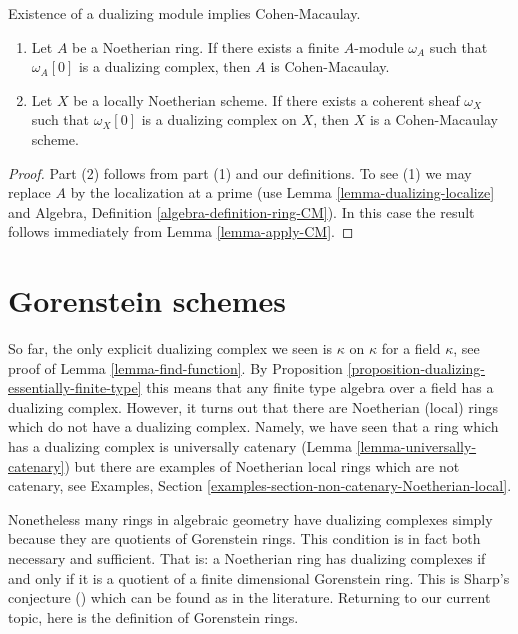 \begin{lemma}
\label{lemma-has-dualizing-module-CM-scheme}
Existence of a dualizing module implies Cohen-Macaulay.
\begin{enumerate}
\item Let $A$ be a Noetherian ring. If there exists a finite $A$-module
$\omega_A$ such that $\omega_A[0]$ is a dualizing complex, then
$A$ is Cohen-Macaulay.
\item Let $X$ be a locally Noetherian scheme. If there exists a coherent sheaf
$\omega_X$ such that $\omega_X[0]$ is a dualizing complex on $X$, then
$X$ is a Cohen-Macaulay scheme.
\end{enumerate}
\end{lemma}

\begin{proof}
Part (2) follows from part (1) and our definitions.
To see (1) we may replace $A$ by the localization at a prime
(use Lemma \ref{lemma-dualizing-localize} and
Algebra, Definition \ref{algebra-definition-ring-CM}).
In this case the result follows immediately from
Lemma \ref{lemma-apply-CM}.
\end{proof}






\section{Gorenstein schemes}
\label{section-gorenstein}

\noindent
So far, the only explicit dualizing complex we seen is $\kappa$ on $\kappa$
for a field $\kappa$, see proof of Lemma \ref{lemma-find-function}.
By Proposition \ref{proposition-dualizing-essentially-finite-type}
this means that any finite type algebra over a field has a dualizing
complex. However, it turns out that there are Noetherian (local) rings
which do not have a dualizing complex. Namely, we have seen that
a ring which has a dualizing complex is universally catenary
(Lemma \ref{lemma-universally-catenary}) but there are examples of
Noetherian local rings which are not catenary, see
Examples, Section \ref{examples-section-non-catenary-Noetherian-local}.

\medskip\noindent
Nonetheless many rings in algebraic geometry have dualizing complexes
simply because they are quotients of Gorenstein rings. This condition
is in fact both necessary and sufficient. That is: a Noetherian ring
has dualizing complexes if and only if it is a quotient of a finite
dimensional Gorenstein ring. This is Sharp's conjecture (\cite{Sharp})
which can be found as \cite[Corollary 1.4]{Kawasaki} in the literature.
Returning to our current topic, here is the definition of Gorenstein rings.


